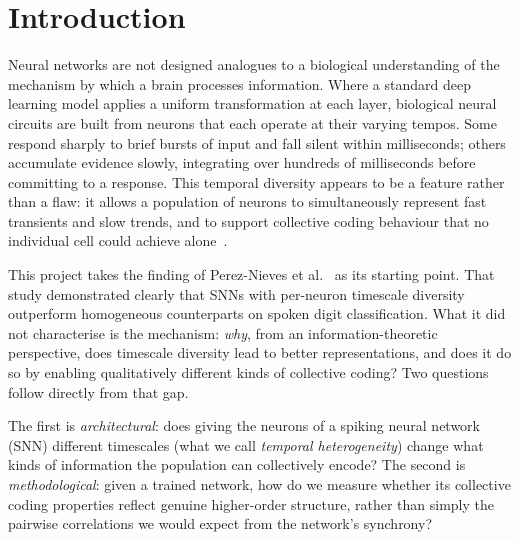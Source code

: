 \documentclass[12pt,twoside]{report}
\date{June 2026}
\begin{document}
\renewcommand{\cleardoublepage}{\clearpage}



\clearpage{\pagestyle{empty}\cleardoublepage}
\setcounter{page}{1}
\pagestyle{fancy}

\clearpage{\pagestyle{empty}\cleardoublepage}
\setcounter{tocdepth}{1}
\tableofcontents

\clearpage{\pagestyle{empty}\cleardoublepage}
\setcounter{page}{1}
\fancyhead[LE,RO]{\slshape \leftmark}
\fancyhead[LO,RE]{}


\chapter{Introduction}

Neural networks are not designed analogues to a biological understanding of the mechanism by which a brain processes information. 
Where a standard deep learning model applies a uniform transformation at each layer, biological 
neural circuits are built from neurons that each operate at their varying tempos. Some respond 
sharply to brief bursts of input and fall silent within milliseconds; others accumulate 
evidence slowly, integrating over hundreds of milliseconds before committing to a response. 
This temporal diversity appears to be a feature rather than a flaw: it allows a population 
of neurons to simultaneously represent fast transients and slow trends, and to support 
collective coding behaviour that no individual cell could achieve alone~\cite{pereznieves2021}.

This project takes the finding of Perez-Nieves et al.~\cite{pereznieves2021} as its 
starting point. That study demonstrated clearly that SNNs with per-neuron timescale 
diversity outperform homogeneous counterparts on spoken digit classification. What it 
did not characterise is the mechanism: \emph{why}, from an information-theoretic 
perspective, does timescale diversity lead to better representations, and does it do 
so by enabling qualitatively different kinds of collective coding? Two questions follow 
directly from that gap.

The first is \emph{architectural}: does giving the neurons of a spiking neural network 
(SNN) different timescales (what we call \emph{temporal heterogeneity}) change what kinds 
of information the population can collectively encode? The second is 
\emph{methodological}: given a trained network, how do we measure whether its collective 
coding properties reflect genuine higher-order structure, rather than simply the pairwise 
correlations we would expect from the network's synchrony?
\end{document}
